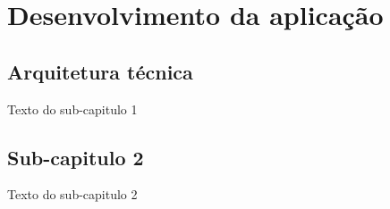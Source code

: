 
\chapter{Desenvolvimento da aplicação}
\section{Arquitetura técnica}
Texto do sub-capitulo 1
\section{Sub-capitulo 2}
Texto do sub-capitulo 2
